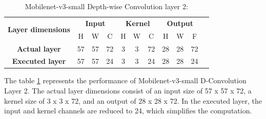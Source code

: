 \begin{table}[H]
\centering
\caption{Mobilenet-v3-small Depth-wise Convolution layer 2:}
\label{tab:unrollDConvolutionCase2Dim}
 \begin{tabular}{|c|c|c|c|c|c|c|c|c|c|c|} \hline  
 
 \multirow{2}{*}{\textbf{Layer dimensions}} &  
 \multicolumn{3}{|c|}{\textbf{Input}} &  
 \multicolumn{3}{|c|}{\textbf{Kernel}} &  
 \multicolumn{3}{|c|}{\textbf{Output}}\\ \cline{2-10}
 & H &  W &  C&  H &  W &  C &  H &  W & F\\ \hline  
 \textbf{Actual layer} &  57 &  57 & 72 & 3 & 3 & 72 & 28 & 28 & 72\\ \hline 
 \textbf{Executed layer} &  57 &  57 &  \cellcolor{yellow}24 & 3 & 3 & \cellcolor{yellow}24 & 28 & 28 & \cellcolor{yellow}24 \\ \hline 
 \end{tabular}
\end{table}

The table  \ref{tab:unrollDConvolutionCase2Dim} represents the performance of Mobilenet-v3-small D-Convolution Layer 2. The actual layer dimensions consist of an input size of 57 x 57 x 72, a kernel size of 3 x 3 x 72, and an output of 28 x 28 x 72. In the executed layer, the input and kernel channels are reduced to 24, which simplifies the computation.

\begin{table}[H]
\centering
\caption{Loop unrolling results}
\label{tab:unrollDConvolutionCase2Results}
\end{table}

